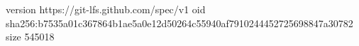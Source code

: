 version https://git-lfs.github.com/spec/v1
oid sha256:b7535a01c367864b1ae5a0e12d50264c55940af7910244452725698847a30782
size 545018
